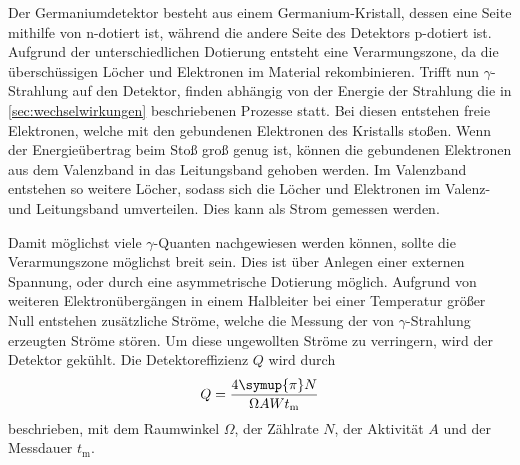 Der Germaniumdetektor besteht aus einem Germanium-Kristall,
dessen eine Seite mithilfe von n-dotiert ist,
während die andere Seite des Detektors p-dotiert ist.
Aufgrund der unterschiedlichen Dotierung entsteht eine Verarmungszone,
da die überschüssigen Löcher und Elektronen im Material rekombinieren.
Trifft nun $\gamma$-Strahlung auf den Detektor,
finden abhängig von der Energie der Strahlung die in \autoref{sec:wechselwirkungen} beschriebenen Prozesse statt.
Bei diesen entstehen freie Elektronen,
welche mit den gebundenen Elektronen des Kristalls stoßen.
Wenn der Energieübertrag beim Stoß groß genug ist,
können die gebundenen Elektronen aus dem Valenzband in das Leitungsband gehoben werden.
Im Valenzband entstehen so weitere Löcher,
sodass sich die Löcher und Elektronen im Valenz- und Leitungsband umverteilen.
Dies kann als Strom gemessen werden.

Damit möglichst viele $\gamma$-Quanten nachgewiesen werden können,
sollte die Verarmungszone möglichst breit sein.
Dies ist über Anlegen einer externen Spannung,
oder durch eine asymmetrische Dotierung möglich.
Aufgrund von weiteren Elektronübergängen in einem Halbleiter bei einer Temperatur größer Null entstehen zusätzliche Ströme,
welche die Messung der von $\gamma$-Strahlung erzeugten Ströme stören.
Um diese ungewollten Ströme zu verringern,
wird der Detektor gekühlt.
Die Detektoreffizienz $Q$ wird durch
\begin{equation}
    Q = \frac{4 \symup{\pi} N}{\Omega A W t_\text{m}}
\end{equation}
beschrieben,
mit dem Raumwinkel $\Omega$,
der Zählrate $N$,
der Aktivität $A$ und der Messdauer $t_\text{m}$.